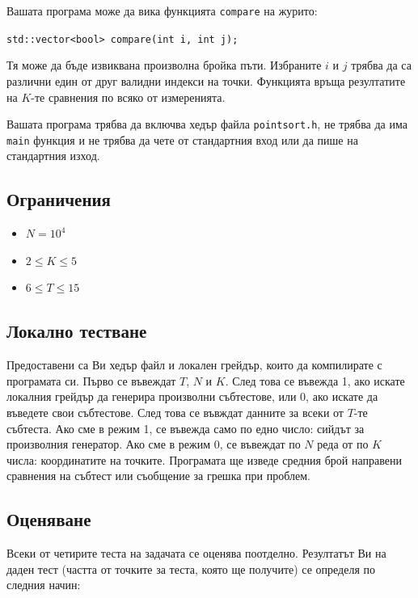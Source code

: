 \documentclass[12pt]{article}
\begin{document}
Вашата програма може да вика функцията \verb|compare| на журито:

\verb|std::vector<bool> compare(int i, int j);|

Тя може да бъде извиквана произволна бройка пъти. Избраните $i$ и $j$ трябва да са различни един от друг валидни индекси на точки. Функцията връща резултатите на $K$-те сравнения по всяко от измеренията.

Вашата програма трябва да включва хедър файла \verb|pointsort.h|, не трябва да има \verb|main| функция и не трябва да чете от стандартния вход или да пише на стандартния изход.

\subsection{Ограничения}

\vspace{0.1em}

\begin{itemize}
\item $ N = 10^4 $
\item $ 2 \leq K \leq 5 $
\item $ 6 \leq T \leq 15 $
\end{itemize}

\subsection{Локално тестване}

Предоставени са Ви хедър файл и локален грейдър, които да компилирате с програмата си. Първо се въвеждат $T$, $N$ и $K$. След това се въвежда 1, ако искате локалния грейдър да генерира произволни събтестове, или 0, ако искате да въведете свои събтестове. След това се въвждат данните за всеки от $T$-те събтеста. Ако сме в режим 1, се въвежда само по едно число: сийдът за произволния генератор. Ако сме в режим 0, се въвеждат по $N$ реда от по $K$ числа: координатите на точките. Програмата ще изведе средния брой направени сравнения на събтест или съобщение за грешка при проблем.

\subsection{Оценяване}

Всеки от четирите теста на задачата се оценява поотделно. Резултатът Ви на даден тест (частта от точките за теста, която ще получите) се определя по следния начин:
\end{document}
